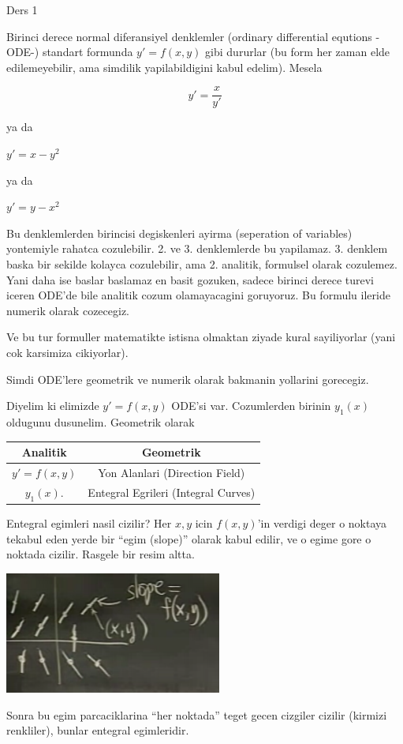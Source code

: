 \documentclass[12pt,fleqn]{article}
\begin{document}
Ders 1

Birinci derece normal diferansiyel denklemler (ordinary differential equtions
-ODE-) standart formunda $y'=f(x,y)$ gibi dururlar (bu form her zaman
elde edilemeyebilir, ama simdilik yapilabildigini kabul edelim).  Mesela

\[ y' = \frac{x}{y'} \] 

ya da

$y' = x-y^2$ 

ya da

$y' = y-x^2$

Bu denklemlerden birincisi degiskenleri ayirma (seperation of variables)
yontemiyle rahatca cozulebilir. 2. ve 3. denklemlerde bu yapilamaz. 3. denklem
baska bir sekilde kolayca cozulebilir, ama 2. analitik, formulsel olarak
cozulemez. Yani daha ise baslar baslamaz en basit gozuken, sadece birinci derece
turevi iceren ODE'de bile analitik cozum olamayacagini goruyoruz. Bu formulu
ileride numerik olarak cozecegiz.

Ve bu tur formuller matematikte istisna olmaktan ziyade kural sayiliyorlar (yani
cok karsimiza cikiyorlar). 

Simdi ODE'lere geometrik ve numerik olarak bakmanin yollarini gorecegiz.

Diyelim ki elimizde $y' = f(x,y)$ ODE'si var. Cozumlerden birinin
$y_1(x)$ oldugunu dusunelim. Geometrik olarak 

\begin{tabular}{cc}
Analitik & Geometrik \\ \hline
$y' = f(x,y)$ & Yon Alanlari (Direction Field) \\
$y_1(x)$. & Entegral Egrileri (Integral Curves)
\end{tabular}

Entegral egimleri nasil cizilir? Her $x,y$ icin $f(x,y)$'in verdigi deger o
noktaya tekabul eden yerde bir ``egim (slope)'' olarak kabul edilir, ve o egime
gore o noktada cizilir. Rasgele bir resim altta.

\includegraphics[height=4cm]{./1_1.png}

Sonra bu egim parcaciklarina ``her noktada'' teget gecen cizgiler cizilir
(kirmizi renkliler), bunlar entegral egimleridir.
\end{document}
